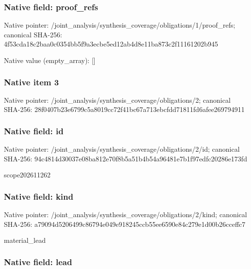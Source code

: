 \documentclass[10pt,a4paper]{article}
\begin{document}
\subsubsection{Native field: proof\_refs}


Native pointer: /joint\_analysis/synthesi\allowbreak{}s\_coverage/obligations/1\allowbreak{}/proof\_refs; canonical SHA-256: 4f53cda18c2baa0c0354bb5f\allowbreak{}9a3ecbe5ed12ab4d8e11ba87\allowbreak{}3c2f11161202b945



Native value (empty\_array): []



\subsubsection{Native item 3}


Native pointer: /joint\_analysis/synthesi\allowbreak{}s\_coverage/obligations/2; canonical SHA-256: 28f0407b23e6799c5a8019cc\allowbreak{}72f41bc67a713ebcfdd71811\allowbreak{}fd6afee269794911



\subsubsection{Native field: id}


Native pointer: /joint\_analysis/synthesi\allowbreak{}s\_coverage/obligations/2\allowbreak{}/id; canonical SHA-256: 94c4814d30037e08ba812e70\allowbreak{}f8b5a51b4b54a96481e7b1f9\allowbreak{}7edfc20286e173fd


scope202611262


\subsubsection{Native field: kind}


Native pointer: /joint\_analysis/synthesi\allowbreak{}s\_coverage/obligations/2\allowbreak{}/kind; canonical SHA-256: a79094d5206499c86794e049\allowbreak{}e918245ccb55ee6590e84c27\allowbreak{}9e1d00b26cceffc7


material\_lead


\subsubsection{Native field: lead}
\end{document}
